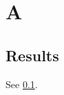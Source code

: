 \documentclass{article}
\begin{document}
\tableofcontents
\section*{A}
\subsection{Results}\label{a}
See \ref{a}.
\end{document}

